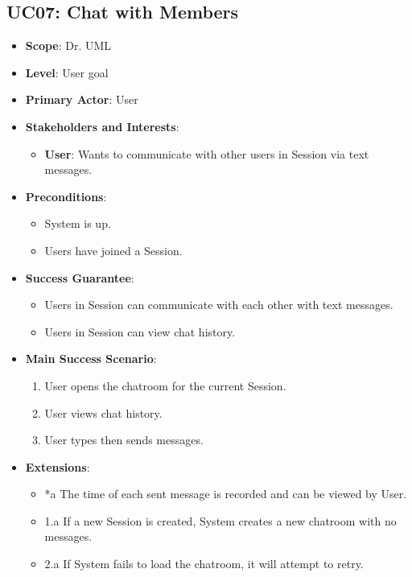 \documentclass[12pt]{article}
\begin{document}
    \subsection{UC07: Chat with Members}
    \begin{itemize}
        \item \textbf{Scope}: Dr. UML
        \item \textbf{Level}: User goal
        \item \textbf{Primary Actor}: User
        \item \textbf{Stakeholders and Interests}:
        \begin{itemize}
            \item \textbf{User}: Wants to communicate with other users in Session via text messages.
        \end{itemize}
        \item \textbf{Preconditions}:
        \begin{itemize}
            \item System is up.
            \item Users have joined a Session.
        \end{itemize}
        \item \textbf{Success Guarantee}:
        \begin{itemize}
            \item Users in Session can communicate with each other with text messages.
            \item Users in Session can view chat history.
        \end{itemize}
        \item \textbf{Main Success Scenario}:
        \begin{enumerate}
            \item User opens the chatroom for the current Session.
            \item User views chat history.
            \item User types then sends messages.
        \end{enumerate}
        \item \textbf{Extensions}:
        \begin{itemize}
            \item *a The time of each sent message is recorded and can be viewed by User.
            \item 1.a If a new Session is created, System creates a new chatroom with no messages.
            \item 2.a If System fails to load the chatroom, it will attempt to retry.

\end{itemize}
\end{itemize}
\end{document}
